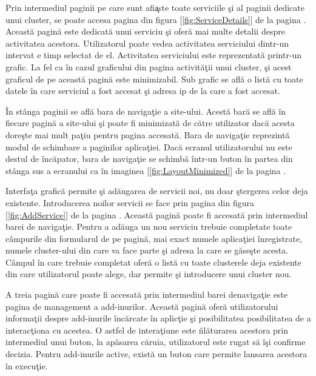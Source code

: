 \documentclass[a4paper,12pt]{report}
\let\oldref\ref
\renewcommand{\ref}[1]{[\oldref{#1}]}
\begin{document}
Prin intermediul paginii pe care sunt afi\c aste toate serviciile \c si al paginii dedicate unui cluster, se poate 
accesa pagina din figura \ref{fig:ServiceDetails} de la pagina \pageref{fig:ServiceDetails}. Aceast\u a pagin\u a
este dedicat\u a unui serviciu \c si ofer\u a mai multe detalii despre activitatea acestora. Utilizatorul poate 
vedea activitatea serviciului dintr-un intervat e timp selectat de el. Activitatea serviciului este reprezentat\u a 
printr-un grafic. La fel ca \^in cazul graficului din pagina activit\u a\c tii unui cluster, \c si acest graficul 
de pe aceast\u a pagin\u a este minimizabil. Sub grafic se afl\u a o list\u a cu toate datele \^in care serviciul 
a fost accesat \c si adresa ip de la care a fost accesat.

\^In st\^anga paginii se afl\u a bara de naviga\c tie a site-ului. Acest\u a bar\u a se afl\u a \^in fiecare pagin\u a a site-ului
\c si poate fi minimizat\u a de c\u atre utilizator dac\u a acesta dore\c ste mai mult pa\c tiu pentru pagina accesat\u a.
Bara de naviga\c tie reprezint\u a modul de schimbare a paginilor aplica\c tiei. Dac\u a ecranul utilizatorului nu este destul de 
\^inc\u apator, bara de naviga\c tie se schimb\u a \^intr-un buton \^in partea din st\^anga sus a ecranului ca \^in imaginea 
\ref{fig:LayoutMinimized} de la pagina \pageref{fig:LayoutMinimized}.

Interfa\c ta grafic\u a permite \c si ad\u augarea de servicii noi, nu doar \c stergerea celor deja existente.
Introducerea noilor servicii se face prin pagina din figura \ref{fig:AddService} de la pagina \pageref{fig:AddService}.
Aceast\u a pagin\u a poate fi accesat\u a prin intermediul barei de naviga\c tie.
Pentru a ad\u auga un nou serviciu trebuie completate toate c\^ampurile din formularul de pe pagin\u a, mai exact 
numele aplica\c tiei \^inregistrate, numele cluster-ului din care va face parte \c si adresa la care se g\u ase\c ste acesta.
C\^ampul \^in care trebuie completat ofer\u a o list\u a cu toate clusterele deja existente din care utilizatorul poate 
alege, dar permite \c si introducere unui cluster nou.

A treia pagin\u a care poate fi accesat\u a prin intermediul barei denaviga\c tie este pagina de management a add-inurilor.
Aceast\u a pagin\u a ofer\u a utilizatorului informa\c tii despre add-inurile \^inc\u arcate \^in aplic\c tie \c si 
posibilitatea posibilitatea de a interac\c tiona cu acestea. O astfel de intera\c tiune este \^nl\u aturarea acestora
prin intermediul unui buton, la ap\u asarea c\u aruia, utilizatorul este rugat s\u a \^i\c si confirme decizia.
Pentru add-inurile active, exist\u a un buton care permite lansarea acestora \^in execu\c tie.
\end{document}
